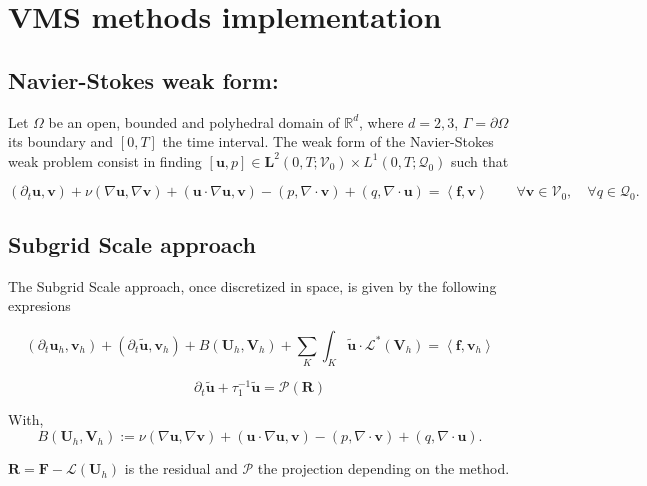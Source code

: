 
\chapter{VMS methods implementation} %
\label{appendix-VMS_implementation}

\section*{Navier-Stokes weak form:}
Let $ \Omega $ be an open, bounded and polyhedral domain of $ \mathbb{R}^d $, where $ d=2,3 $, $ \Gamma=\partial\Omega $ its boundary and $ [0,T] $ the time interval. The weak form of the Navier-Stokes weak problem consist in finding $ [\mathbf{u},p]\in\mathbf{L}^2(0,T;\mathcal{V}_0)\times L^1(0,T;\mathcal{Q}_0) $ such that

\begin{equation}
\label{1}
(\partial_t\mathbf{u},\mathbf{v})+\nu(\nabla\mathbf{u},\nabla\mathbf{v})+(\mathbf{u}\cdot\nabla\mathbf{u},\mathbf{v})-(p,\nabla\cdot\mathbf{v})+(q,\nabla\cdot\mathbf{u})=\left<\mathbf{f},\mathbf{v}\right>\quad\quad\forall\mathbf{v}\in\mathcal{V}_0,\quad\forall q\in\mathcal{Q}_0.
\end{equation}

\section*{Subgrid Scale approach}
The Subgrid Scale approach, once discretized in space, is given by the following expresions

\begin{equation}
\label{2}
(\partial_t\mathbf{u}_h,\mathbf{v}_h)+(\partial_t\tilde{\mathbf{u}},\mathbf{v}_h)+B(\mathbf{U}_h,\mathbf{V}_h)+\sum_K\int_K\tilde{\mathbf{u}}\cdot\mathcal{L}^*(\mathbf{V}_h)=\left<\mathbf{f},\mathbf{v}_h\right>
\end{equation}

\begin{equation}
\label{3}
\partial_t\tilde{\mathbf{u}}+\tau_1^{-1}\tilde{\mathbf{u}}=\mathcal{P}(\mathbf{R})
\end{equation}

With, $$B(\mathbf{U}_h,\mathbf{V}_h):=\nu(\nabla\mathbf{u},\nabla\mathbf{v})+(\mathbf{u}\cdot\nabla\mathbf{u},\mathbf{v})-(p,\nabla\cdot\mathbf{v})+(q,\nabla\cdot\mathbf{u}).$$

$\mathbf{R}=\mathbf{F}-\mathcal{L}(\mathbf{U}_h)$ is the residual and $\mathcal{P}$ the projection depending on the method.

